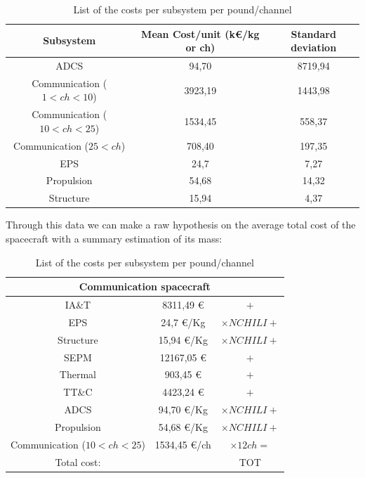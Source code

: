 \documentclass[11pt,a4paper,titlepage]{article}
\begin{document}
		\begin{table}
			\centering
			\begin{tabular}{ccc}
			\toprule
			Subsystem & Mean Cost/unit (k\euro/kg or ch) & Standard deviation\\
			\midrule
			ADCS                                         & 94,70     & 8719,94\\
			Communication ($1 < ch < 10$)   & 3923,19 & 1443,98\\
			Communication ($10 < ch < 25$) & 1534,45 & 558,37\\
			Communication ($25 < ch$)         & 708,40   & 197,35\\
			EPS                                            & 24,7      & 7,27\\
			Propulsion                                  & 54,68     & 14,32\\
			Structure                                    & 15,94     & 4,37\\
			\bottomrule
			\end{tabular}
			\caption{List of the costs per subsystem per pound/channel}
			\label{tab:systems2}
		\end{table}

		Through this data we can make a raw hypothesis on the average total cost of the spacecraft with a summary estimation 			of its mass:

		\begin{table}
			\centering
			\begin{tabular}{ccc}
			\toprule
			\multicolumn{3}{c}{Communication spacecraft}\\
			\midrule
			IA\&T       & 8311,49 \euro       & $+$\\
			EPS          & 24,7 \euro/Kg        & $\times NCHILI +$\\
			Structure   & 15,94  \euro/Kg     & $\times NCHILI +$\\
			SEPM        & 12167,05 \euro     & $+$\\
			Thermal    & 903,45 \euro        & $+$\\
			TT\&C       & 4423,24 \euro      & $+$\\
			ADCS        & 94,70 \euro/Kg     & $\times NCHILI +$\\
			Propulsion & 54,68   \euro/Kg   & $\times NCHILI +$\\
			Communication ($10 < ch < 25$) & 1534,45 \euro/ch & $\times 12 ch =$\\
			\bottomrule
			Total cost:& & TOT\\
			\end{tabular}
			\caption{List of the costs per subsystem per pound/channel}
			\label{tab:cost}
		\end{table}
\end{document}
